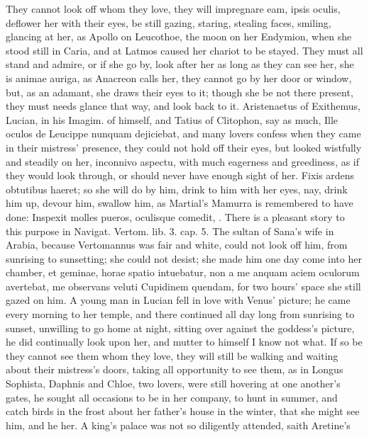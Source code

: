 They cannot look off whom they love, they will impregnare eam, ipsis
oculis, deflower her with their eyes, be still gazing, staring,
stealing faces, smiling, glancing at her, as Apollo on Leucothoe,
the moon on her Endymion, when she stood still in Caria, and at
Latmos caused her chariot to be stayed. They must all stand and admire,
or if she go by, look after her as long as they can see her, she is
animae auriga, as Anacreon calls her, they cannot go by her door or
window, but, as an adamant, she draws their eyes to it; though she be
not there present, they must needs glance that way, and look back to
it. Aristenaetus of  Exithemus, Lucian, in his Imagim. of
himself, and Tatius of Clitophon, say as much, Ille oculos de Leucippe
nunquam dejiciebat, and many lovers confess when they came in
their mistress' presence, they could not hold off their eyes, but
looked wistfully and steadily on her, inconnivo aspectu, with much
eagerness and greediness, as if they would look through, or should
never have enough sight of her. Fixis ardens obtutibus haeret; so she
will do by him, drink to him with her eyes, nay, drink him up, devour
him, swallow him, as Martial's Mamurra is remembered to have done:
Inspexit molles pueros, oculisque comedit, \etc{}. There is a pleasant
story to this purpose in Navigat. Vertom. lib. 3. cap. 5. The sultan of
Sana's wife in Arabia, because Vertomannus was fair and white, could
not look off him, from sunrising to sunsetting; she could not desist;
she made him one day come into her chamber, et geminae, horae spatio
intuebatur, non a me anquam aciem oculorum avertebat, me observans
veluti Cupidinem quendam, for two hours' space she still gazed on him.
A young man in Lucian fell in love with Venus' picture; he came
every morning to her temple, and there continued all day long
from sunrising to sunset, unwilling to go home at night, sitting
over against the goddess's picture, he did continually look upon her,
and mutter to himself I know not what. If so be they cannot see them
whom they love, they will still be walking and waiting about their
mistress's doors, taking all opportunity to see them, as in
Longus Sophista, Daphnis and Chloe, two lovers, were still
hovering at one another's gates, he sought all occasions to be in her
company, to hunt in summer, and catch birds in the frost about her
father's house in the winter, that she might see him, and he her.
A king's palace was not so diligently attended, saith Aretine's
